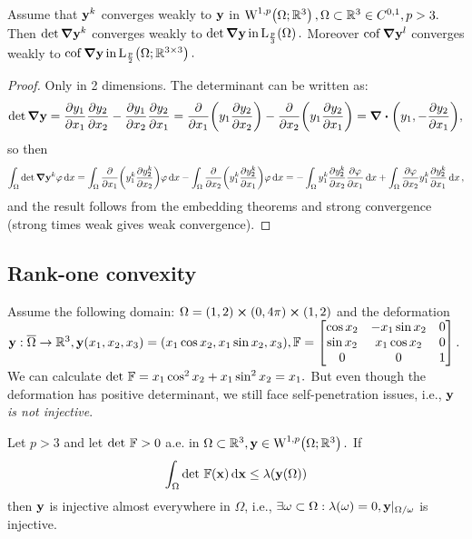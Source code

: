 \documentclass[reqno, a4paper]{article}
\begin{document}
\begin{theorem}[Magic]
	Assume that $\vb{y}^k$ converges weakly to $\vb{y}$ in $\WkpSet[1][p]{\Omega;\R^3}, \Omega \subset \R^3 \in C^{0,1}, p>3.$ Then $\det \grad \vb{y}^k$ converges weakly to $\det \grad \vb{y} \, \text{in} \, \LpSet[\frac{p}{3}]{\Omega}.$ Moreover $\operatorname{cof} \grad \vb{y}^l$ converges weakly to $\cof \grad \vb{y} \, \text{in} \, \LpSet[\frac{p}{2}]{\Omega;\R^{3 \times 3}}.$
\end{theorem}

\begin{proof}
	Only in 2 dimensions. The determinant can be written as:
	\[
		\det \grad \vb{y} = \pdv{y_1}{x_1}\pdv{y_2}{x_2}-\pdv{y_1}{x_2}\pdv{y_2}{x_1} = \pdv{x_1}\qty(y_1 \pdv{y_2}{x_2})-\pdv{x_2}\qty(y_1 \pdv{y_2}{x_1}) = \divergence{\qty(y_1,-\pdv{y_2}{x_1})},
	\]
	so then
	\[
		\int_{\Omega}\det \grad \vb{y}^k \varphi \dd{x} = \int_{\Omega}\pdv{x_1} \qty(y^k_1 \pdv{y_2^k}{x_2})\varphi\dd{x} - \int_{\Omega}\pdv{x_2}\qty(y^k_1 \pdv{y^k_2}{x_1})\varphi\dd{x} = -\int_{\Omega}y_1^k \pdv{y_2^k}{x_2}\pdv{\varphi}{x_1} \dd{x} + \int_{\Omega}\pdv{\varphi}{x_2} y_1^k \pdv{y_2^k}{x_1}\dd{x},
	\]
	and the result follows from the embedding theorems and strong convergence (strong times weak gives weak convergence).
\end{proof}

\subsection{Rank-one convexity}
\label{sec:rank-one}


	Assume the following domain: $\Omega = (1,2) \cross (0,4 \pi) \cross (1,2)$ and the deformation $\vb{y}: \overline{\Omega} \to {\mathbb R}^3, \vb{y}\qty(x_1,x_2,x_3) = \qty(x_1 \cos x_2, x_1 \sin x_2, x_3), \mathbb{F}  = \begin{bmatrix}
		\cos x_2 & -x_1 \sin x_2 & 0\\
		\sin x_2 & x_1 \cos x_2 & 0\\
		0 & 0 & 1
	\end{bmatrix}.$
	We can calculate $\det\, \mathbb{F} = x_1 \cos^{2}x_2 + x_1 \sin^{2}x_2 = x_1.$ But even though the deformation has positive determinant, we still face self-penetration issues, i.e., \textit{$\vb{y}$ is not injective}.

	\begin{theorem}
    Let $p>3$ and let $\det\, \mathbb{F} > 0$ a.e. in $\Omega \subset \R^3, \vb{y} \in \WkpSet[1][p]{\Omega; \R^3}.$ If
    \[
	    \int_{\Omega}\det\, \mathbb{F}\qty(\vb{x})\dd{\vb{x}} \leq \lambda\qty(\vb{y}\qty(\Omega))
    \]
    then $\vb{y}$ is injective almost everywhere in $\Omega$, i.e., $\exists \omega \subset \Omega: \lambda\qty(\omega) = 0, \vb{y}|_{\Omega / \omega}$ is injective.
\end{theorem}
\end{document}
